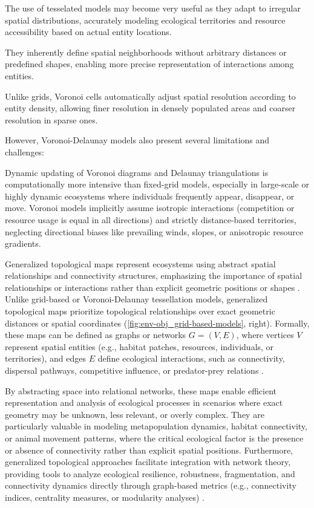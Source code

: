 The use of tesselated models may become very useful as they adapt to irregular spatial distributions, accurately modeling ecological territories and resource accessibility based on actual entity locations.

They inherently define spatial neighborhoods without arbitrary distances or predefined shapes, enabling more precise representation of interactions among entities.

Unlike grids, Voronoi cells automatically adjust spatial resolution according to entity density, allowing finer resolution in densely populated areas and coarser resolution in sparse ones.

However, Voronoi-Delaunay models also present several limitations and challenges:
\begin{Itemize}
    \Item{} Dynamic updating of Voronoi diagrams and Delaunay triangulations is computationally more intensive than fixed-grid models, especially in large-scale or highly dynamic ecosystems where individuals frequently appear, disappear, or move.
    \Item{} Voronoi models implicitly assume isotropic interactions (competition or resource usage is equal in all directions) and strictly distance-based territories, neglecting directional biases like prevailing winds, slopes, or anisotropic resource gradients.
\end{Itemize}



Generalized topological maps represent ecosystems using abstract spatial relationships and connectivity structures, emphasizing the importance of spatial relationships or interactions rather than explicit geometric positions or shapes \cite{Urban2009}. Unlike grid-based or Voronoi-Delaunay tessellation models, generalized topological maps prioritize topological relationships over exact geometric distances or spatial coordinates (\cref{fig:env-obj_grid-based-models}, right). Formally, these maps can be defined as graphs or networks $G = (V, E)$, where vertices $V$ represent spatial entities (e.g., habitat patches, resources, individuals, or territories), and edges $E$ define ecological interactions, such as connectivity, dispersal pathways, competitive influence, or predator-prey relations \cite{Hamonic2021,Minor2008,Peterson2024}.

By abstracting space into relational networks, these maps enable efficient representation and analysis of ecological processes in scenarios where exact geometry may be unknown, less relevant, or overly complex. They are particularly valuable in modeling metapopulation dynamics, habitat connectivity, or animal movement patterns, where the critical ecological factor is the presence or absence of connectivity rather than explicit spatial positions. Furthermore, generalized topological approaches facilitate integration with network theory, providing tools to analyze ecological resilience, robustness, fragmentation, and connectivity dynamics directly through graph-based metrics (e.g., connectivity indices, centrality measures, or modularity analyses) \cite{Lemiere2023,Gaucherel2012}.

